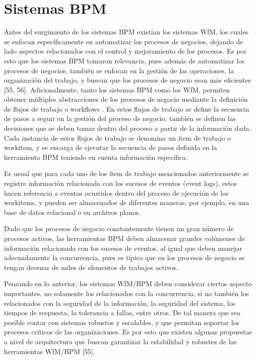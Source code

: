 \section{Sistemas BPM} %
\label{section1.2}

Antes del surgimiento de los sistemas BPM existían los sistemas WfM, los cuales se enfocan específicamente en automatizar los procesos de negocios, dejando de lado aspectos relacionados con el control y mejoramiento de los procesos. Es por esto que los sistemas BPM tomaron relevancia, pues además de automatizar los procesos de negocios, también se enfocan en la gestión de las operaciones, la organización del trabajo, y buscan que los procesos de negocio sean más eficientes [55, 56]. Adicionalmente, tanto los sistemas BPM como los WfM, permiten obtener múltiples abstracciones de los procesos de negocio mediante la definición de flujos de trabajo o workflows \cite{VanderAalst2004}. En estos flujos de trabajo se define la secuencia de pasos a seguir en la gestión del proceso de negocio, también se definen las decisiones que se deben tomar dentro del proceso a partir de la información dada. Cada instancia de estos flujos de trabajo se denomina un ítem de trabajo o workitem, y se encarga de ejecutar la secuencia de pasos definida en la herramienta BPM teniendo en cuenta información específica. 

Es usual que para cada uno de los ítem de trabajo mencionados anteriormente se registre información relacionada con los sucesos de eventos (event logs), estos hacen referencia a eventos ocurridos dentro del proceso de ejecución de los workitems, y pueden ser almacenados de diferentes maneras, por ejemplo, en una base de datos relacional o en archivos planos. 

Dado que los procesos de negocio constantemente tienen un gran número de procesos activos, las herramientas BPM deben almacenar grandes volúmenes de información relacionada con los sucesos de eventos, al igual que deben manejar adecuadamente la concurrencia, pues es típico que en los procesos de negocio se tengan decenas de miles de elementos de trabajos activos.

Pensando en lo anterior, los sistemas WfM/BPM deben considerar ciertos aspecto importantes, no solamente los relacionados con la concurrencia, si no también los relacionados con la seguridad de la información, la seguridad del sistema, los tiempos de respuesta, la tolerancia a fallas, entre otros. De tal manera que sea posible contar con sistemas robustos y escalables, y que permitan soportar los procesos críticos de las organizaciones. Es por esto que existen algunas propuestas a nivel de arquitectura que buscan garantizar la estabilidad y robustez de las herramientas WfM/BPM [55]. 

